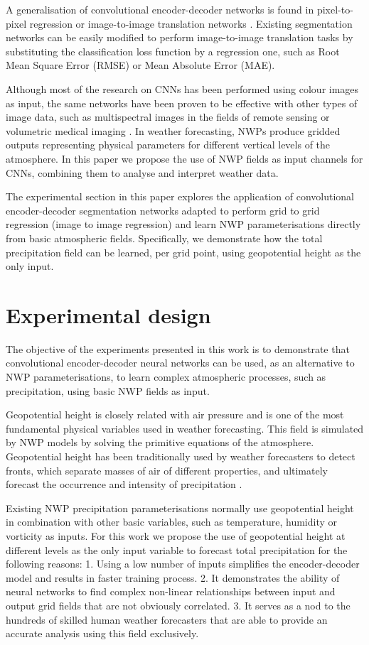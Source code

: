 \documentclass[twocol]{ametsoc}
\begin{document}
A generalisation of convolutional encoder-decoder networks is found in pixel-to-pixel regression or image-to-image translation networks \citep{isola2017image}. Existing segmentation networks can be easily modified to perform image-to-image translation tasks by substituting the classification loss function by a regression one, such as Root Mean Square Error (RMSE) or Mean Absolute Error (MAE).

Although most of the research on CNNs has been performed using colour images as input, the same networks have been proven to be effective with other types of image data, such as multispectral images in the fields of remote sensing \citep{hu2015transferring} or volumetric medical imaging \citep{milletari2016v}. In weather forecasting, NWPs produce gridded outputs representing physical parameters for different vertical levels of the atmosphere. In this paper we propose the use of NWP fields as input channels for CNNs, combining them to analyse and interpret weather data.

The experimental section in this paper explores the application of convolutional encoder-decoder segmentation networks adapted to perform grid to grid regression (image to image regression) and learn NWP parameterisations directly from basic atmospheric fields. Specifically, we demonstrate how the total precipitation field can be learned, per grid point, using geopotential height as the only input.


\section{Experimental design}

The objective of the experiments presented in this work is to demonstrate that convolutional encoder-decoder neural networks can be used, as an alternative to NWP parameterisations, to learn complex atmospheric processes, such as precipitation, using basic NWP fields as input.

Geopotential height is closely related with air pressure and is one of the most fundamental physical variables used in weather forecasting. This field is simulated by NWP models by solving the primitive equations of the atmosphere. Geopotential height has been traditionally used by weather forecasters to detect fronts, which separate masses of air of different properties, and ultimately forecast the occurrence and intensity of precipitation \citep{renard1965experiments,hope2014comparison}.

Existing NWP precipitation parameterisations normally use geopotential height in combination with other basic variables, such as temperature, humidity or vorticity as inputs. For this work we propose the use of geopotential height at different levels as the only input variable to forecast total precipitation for the following reasons: 1. Using a low number of inputs simplifies the encoder-decoder model and results in faster training process. 2. It demonstrates the ability of neural networks to find complex non-linear relationships between input and output grid fields that are not obviously correlated. 3. It serves as a nod to the hundreds of skilled human weather forecasters that are able to provide an accurate analysis using this field exclusively.
\end{document}
